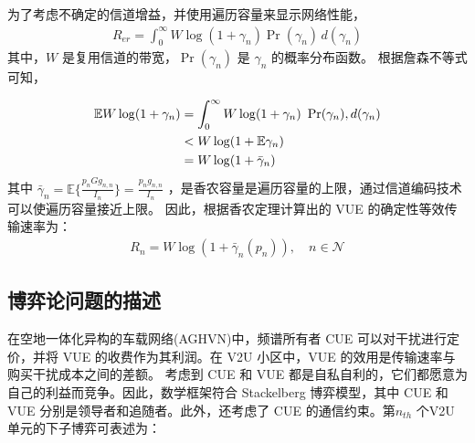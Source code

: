 为了考虑不确定的信道增益，并使用遍历容量来显示网络性能，
\begin{eqnarray}\label{E2-8}
R_{er}=\int_{0}^{\infty} W \log(1+\gamma_{n})\Pr(\gamma_{n})\, d(\gamma_{n})
\end{eqnarray}
其中，$W$ 是复用信道的带宽，$\Pr(\gamma_{n})$ 是 $\gamma_{n}$ 的概率分布函数。
根据詹森不等式可知，

\begin{align} \label{E2-9}
\mathbb{E}{W \log(1+\gamma_{n})} &= \int_{0}^{\infty} W \log(1+\gamma_{n})\ \Pr(\gamma_{n}), d(\gamma_{n}) \\
&< W\log(1+\mathbb{E}{\gamma_{n}})   \notag \\
&= W\log(1+\bar{\gamma}_{n})                \notag
\end{align}
其中 $\bar{\gamma}_{n}\!=\mathbb{E}\{\!\frac{p_{n}G g_{n,n}}{I_n}\}
\!=\!\frac{p_{n}g_{n,n}}{I_n}$ ，是香农容量是遍历容量的上限，通过信道编码技术可以使遍历容量接近上限。
因此，根据香农定理计算出的 VUE 的确定性等效传输速率为：
\begin{eqnarray}\label{E2-10}
R_{n}=W\log(1+\bar{\gamma}_{n}(p_n)),\quad  n\in\mathcal{N}
\end{eqnarray}
\subsection{博弈论问题的描述}\label{section2-2-2}
在空地一体化异构的车载网络(AGHVN)中，频谱所有者 CUE 可以对干扰进行定价，并将 VUE 的收费作为其利润。在 V2U 小区中，VUE 的效用是传输速率与购买干扰成本之间的差额。
考虑到 CUE 和 VUE 都是自私自利的，它们都愿意为自己的利益而竞争。因此，数学框架符合 Stackelberg 博弈模型，其中 CUE 和 VUE 分别是领导者和追随者。此外，还考虑了
 CUE 的通信约束。第$n_{th}$ 个V2U 单元的下子博弈可表述为：

